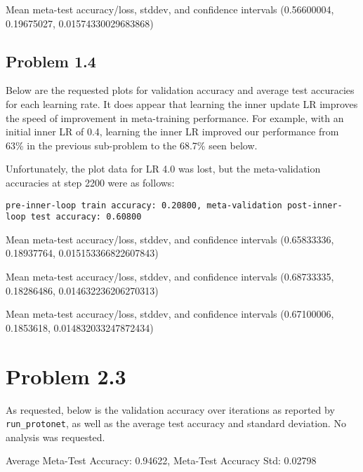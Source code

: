 \documentclass[11pt]{article}
\begin{document}
\vspace*{5em}

Mean meta-test accuracy/loss, stddev, and confidence intervals
(0.56600004, 0.19675027, 0.01574330029683868)


\clearpage
\subsection*{Problem 1.4}

Below are the requested plots for validation accuracy and average test accuracies for each learning rate. It does appear that learning the inner update LR improves the speed of improvement in meta-training performance. For example, with an initial inner LR of 0.4, learning the inner LR improved our performance from 63\% in the previous sub-problem to the 68.7\% seen below. 

Unfortunately, the plot data for LR 4.0 was lost, but the meta-validation accuracies at step  2200 were as follows: 

\texttt{pre-inner-loop train accuracy: 0.20800, meta-validation post-inner-loop test accuracy: 0.60800}

Mean meta-test accuracy/loss, stddev, and confidence intervals
(0.65833336, 0.18937764, 0.015153366822607843)

\vspace*{5em}

Mean meta-test accuracy/loss, stddev, and confidence intervals
(0.68733335, 0.18286486, 0.014632236206270313)


\clearpage
\vspace*{5em}


Mean meta-test accuracy/loss, stddev, and confidence intervals
(0.67100006, 0.1853618, 0.014832033247872434)


\clearpage
\section*{Problem 2.3}

As requested, below is the validation accuracy over iterations as reported by \texttt{run\_protonet}, as well as the average test accuracy and standard deviation. No analysis was requested. 


Average Meta-Test Accuracy: 0.94622, Meta-Test Accuracy Std: 0.02798
\end{document}

